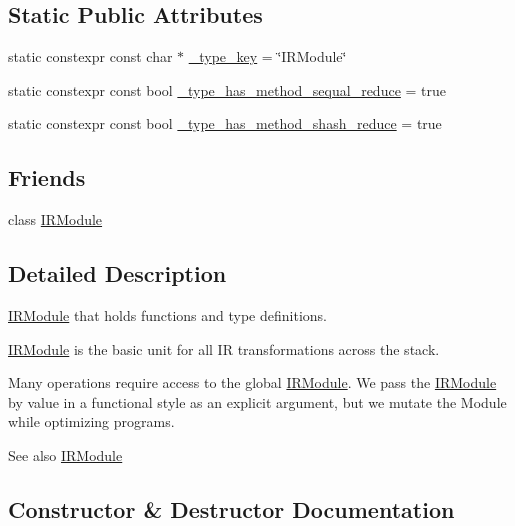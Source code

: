 \subsection*{Static Public Attributes}
\begin{DoxyCompactItemize}
\item 
static constexpr const char $\ast$ \hyperlink{classtvm_1_1IRModuleNode_a6437f77d18cf9a45f2c183d050605d15}{\+\_\+type\+\_\+key} = \char`\"{}I\+R\+Module\char`\"{}
\item 
static constexpr const bool \hyperlink{classtvm_1_1IRModuleNode_a3c64ad855dbfb5851fc6590f1be417d6}{\+\_\+type\+\_\+has\+\_\+method\+\_\+sequal\+\_\+reduce} = true
\item 
static constexpr const bool \hyperlink{classtvm_1_1IRModuleNode_a8900caed3cd5b810aa2a49877028e53d}{\+\_\+type\+\_\+has\+\_\+method\+\_\+shash\+\_\+reduce} = true
\end{DoxyCompactItemize}
\subsection*{Friends}
\begin{DoxyCompactItemize}
\item 
class \hyperlink{classtvm_1_1IRModuleNode_a2b30d3e406c01bb6287d1d7514ecaf46}{I\+R\+Module}
\end{DoxyCompactItemize}


\subsection{Detailed Description}
\hyperlink{classtvm_1_1IRModule}{I\+R\+Module} that holds functions and type definitions. 

\hyperlink{classtvm_1_1IRModule}{I\+R\+Module} is the basic unit for all IR transformations across the stack.

Many operations require access to the global \hyperlink{classtvm_1_1IRModule}{I\+R\+Module}. We pass the \hyperlink{classtvm_1_1IRModule}{I\+R\+Module} by value in a functional style as an explicit argument, but we mutate the Module while optimizing programs. \begin{DoxySeeAlso}{See also}
\hyperlink{classtvm_1_1IRModule}{I\+R\+Module} 
\end{DoxySeeAlso}


\subsection{Constructor \& Destructor Documentation}
